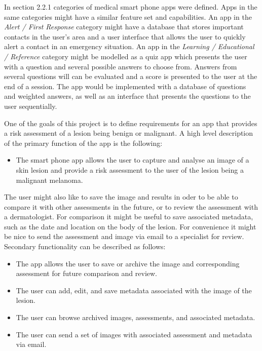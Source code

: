 In section 2.2.1 categories of medical smart phone apps were defined. Apps in the same categories might have a similar feature set and capabilities. An app in the \textit{Alert / First Response} category might have a database that stores important contacts in the user’s area and a user interface that allows the user to quickly alert a contact in an emergency situation. An app in the \textit{Learning / Educational / Reference} category might be modelled as a quiz app which presents the user with a question and several possible answers to choose from. Answers from several questions will can be evaluated and a score is presented to the user at the end of a session. The app would be implemented with a database of questions and weighted answers, as well as an interface that presents the questions to the user sequentially.

One of the goals of this project is to define requirements for an app that provides a risk assessment of a lesion being benign or malignant. A high level description of the primary function of the app is the following:

\begin{itemize}[label={}]
\item The smart phone app allows the user to capture and analyse an image of a skin lesion and provide a risk assessment to the user of the lesion being a malignant melanoma.

\end{itemize}

The user might also like to save the image and results in oder to be able to compare it with other assessments in the future, or to review the assessment with a dermatologist. For comparison it might be useful to save associated metadata, such as the date and location on the body of the lesion. For convenience it might be nice to send the assessment and image via email to a specialist for review.
Secondary functionality can be described as follows:

\begin{itemize}[label={}]
\item The app allows the user to save or archive the image and corresponding assessment for future comparison and review.
\item The user can add, edit, and save metadata associated with the image of the lesion.
\item The user can browse archived images, assessments, and associated metadata.
\item The user can send a set of images with associated assessment and metadata via email.
\end{itemize}

